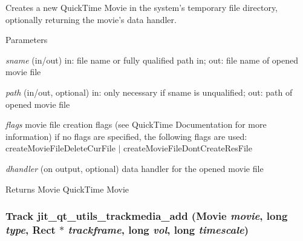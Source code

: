 Creates a new QuickTime Movie in the system's temporary file directory, optionally returning the movie's data handler. 
\begin{DoxyParams}{Parameters}
\item[{\em sname}](in/out) in: file name or fully qualified path in; out: file name of opened movie file \item[{\em path}](in/out, optional) in: only necessary if sname is unqualified; out: path of opened movie file \item[{\em flags}]movie file creation flags (see QuickTime Documentation for more information) if no flags are specified, the following flags are used: createMovieFileDeleteCurFile $|$ createMovieFileDontCreateResFile \item[{\em dhandler}](on output, optional) data handler for the opened movie file\end{DoxyParams}
\begin{DoxyReturn}{Returns}
Movie QuickTime Movie 
\end{DoxyReturn}
\hypertarget{group__qtutilsmod_ga6f388f5d8b0a03ad1c35bcab9c3b2e3d}{
\subsubsection[{jit\_\-qt\_\-utils\_\-trackmedia\_\-add}]{\setlength{\rightskip}{0pt plus 5cm}Track jit\_\-qt\_\-utils\_\-trackmedia\_\-add (Movie {\em movie}, \/  long {\em type}, \/  Rect $\ast$ {\em trackframe}, \/  long {\em vol}, \/  long {\em timescale})}}
\label{group__qtutilsmod_ga6f388f5d8b0a03ad1c35bcab9c3b2e3d}


